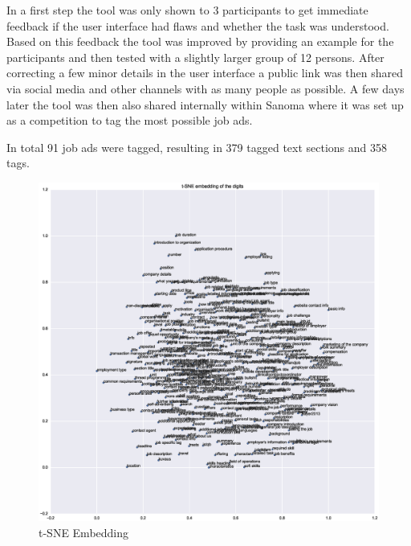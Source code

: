 In a first step the tool was only shown to 3 participants to get immediate feedback if the user interface had flaws and whether the task was understood.   Based on this feedback the tool was improved by providing an example for the participants and then tested with a slightly larger group of 12 persons. After correcting a few minor details in the user interface a public link was then shared via social media and other channels with as many people as possible. A few days later the tool was then also shared internally within Sanoma where it was set up as a competition to tag the most possible job ads.

In total 91 job ads were tagged, resulting in 379 tagged text sections and 358 tags.


\begin{figure}[h]
    \centering
    \includegraphics[width=\textwidth]{img/paragraph-data-tSNE.eps}
    \caption{t-SNE Embedding}
  \label{fig:paragraph-data-tSNE}
\end{figure}

